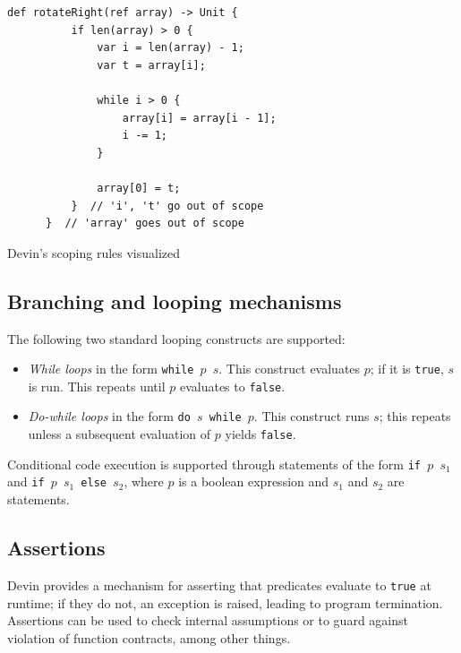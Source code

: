 \documentclass[UdineBachThesis,american,11pt]{PhdThesis}
\begin{document}
  \begin{Listing}[H]
    \begin{Verbatim}[gobble=6,fontsize=\small]
      def rotateRight(ref array) -> Unit {
          if len(array) > 0 {
              var i = len(array) - 1;
              var t = array[i];

              while i > 0 {
                  array[i] = array[i - 1];
                  i -= 1;
              }

              array[0] = t;
          }  // 'i', 't' go out of scope
      }  // 'array' goes out of scope
    \end{Verbatim}

    \caption{Devin's scoping rules visualized}
  \end{Listing}

  \subsection{Branching and looping mechanisms}

  The following two standard looping constructs are supported:

  \begin{itemize}
    \item \emph{While loops} in the form \mbox{\texttt{while $p$ $s$}}. This
    construct evaluates $p$; if it is \mbox{\texttt{true}}, $s$ is run. This
    repeats until $p$ evaluates to \mbox{\texttt{false}}.

    \item \emph{Do-while loops} in the form \mbox{\texttt{do $s$ while $p$}}.
    This construct runs $s$; this repeats unless a subsequent evaluation of $p$
    yields \mbox{\texttt{false}}.
  \end{itemize}

  Conditional code execution is supported through statements of the form
  \mbox{\texttt{if $p$ $s_1$}} and \mbox{\texttt{if $p$ $s_1$ else $s_2$}},
  where $p$ is a boolean expression and $s_1$ and $s_2$ are statements.

  \subsection{Assertions}

  Devin provides a mechanism for asserting that predicates evaluate to
  \mbox{\texttt{true}} at runtime; if they do not, an exception is raised,
  leading to program termination. Assertions can be used to check internal
  assumptions or to guard against violation of function contracts, among other
  things.
\end{document}
